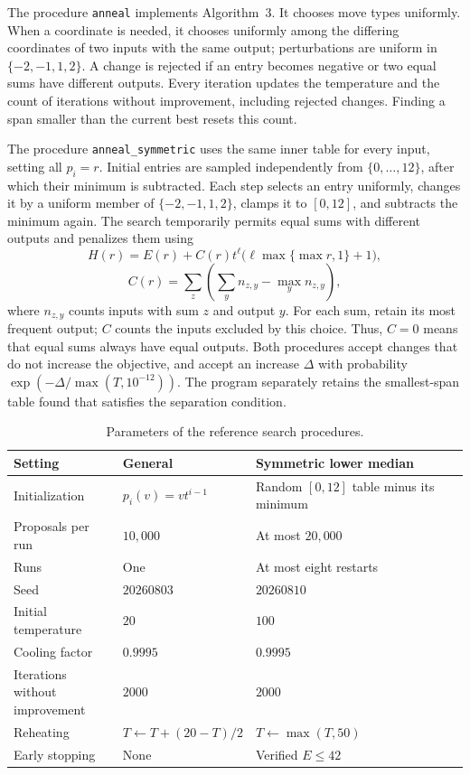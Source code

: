 \documentclass[11pt,a4paper]{article}
\begin{document}
The procedure \texttt{anneal} implements Algorithm~3. It chooses move types uniformly. When a coordinate is needed, it chooses uniformly among the differing coordinates of two inputs with the same output; perturbations are uniform in $\{-2,-1,1,2\}$. A change is rejected if an entry becomes negative or two equal sums have different outputs. Every iteration updates the temperature and the count of iterations without improvement, including rejected changes. Finding a span smaller than the current best resets this count.

The procedure \texttt{anneal\_symmetric} uses the same inner table for every input, setting all $p_i=r$. Initial entries are sampled independently from $\{0,\ldots,12\}$, after which their minimum is subtracted. Each step selects an entry uniformly, changes it by a uniform member of $\{-2,-1,1,2\}$, clamps it to $[0,12]$, and subtracts the minimum again. The search temporarily permits equal sums with different outputs and penalizes them using
\[
 H(r)=E(r)+C(r)t^\ell\bigl(\ell\max\{\max r,1\}+1\bigr),
\]\[
 C(r)=\sum_z\left(\sum_y n_{z,y}-\max_y n_{z,y}\right),
\]
where $n_{z,y}$ counts inputs with sum $z$ and output $y$. For each sum, retain its most frequent output; $C$ counts the inputs excluded by this choice. Thus, $C=0$ means that equal sums always have equal outputs. Both procedures accept changes that do not increase the objective, and accept an increase $\Delta$ with probability $\exp(-\Delta/\max(T,10^{-12}))$. The program separately retains the smallest-span table found that satisfies the separation condition.

\begin{table}[H]
\centering\small
\caption{Parameters of the reference search procedures.}
\label{tab:search-parameters}
\begin{tabular}{lll}
\hline
Setting & General & Symmetric lower median\\
\hline
Initialization & $p_i(v)=vt^{i-1}$ & \makecell[l]{Random $[0,12]$ table\\minus its minimum}\\
Proposals per run & $10{,}000$ & At most $20{,}000$\\
Runs & One & At most eight restarts\\
Seed & $20260803$ & $20260810$\\
Initial temperature & $20$ & $100$\\
Cooling factor & $0.9995$ & $0.9995$\\
\makecell[l]{Iterations without\\improvement} & $2000$ & $2000$\\
Reheating & $T\leftarrow T+(20-T)/2$ & $T\leftarrow\max(T,50)$\\
Early stopping & None & Verified $E\leq42$\\
\hline
\end{tabular}
\end{table}
\end{document}
